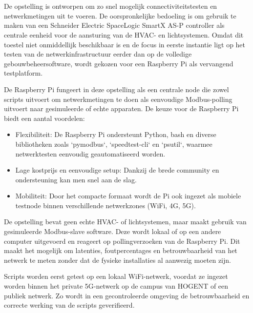 \chapter{}%
\label{ch:basisopstelling}

De opstelling is ontworpen om zo snel mogelijk connectiviteitstesten en netwerkmetingen uit te voeren. De oorspronkelijke bedoeling is om gebruik te maken van een Schneider Electric SpaceLogic SmartX AS-P controller als centrale eenheid voor de aansturing van de HVAC- en lichtsystemen. Omdat dit toestel niet onmiddellijk beschikbaar is en de focus in eerste instantie ligt op het testen van de netwerkinfrastructuur eerder dan op de volledige gebouwbeheersoftware, wordt gekozen voor een Raspberry Pi als vervangend testplatform.

De Raspberry Pi fungeert in deze opstelling als een centrale node die zowel scripts uitvoert om netwerkmetingen te doen als eenvoudige Modbus-polling uitvoert naar gesimuleerde of echte apparaten. De keuze voor de Raspberry Pi biedt een aantal voordelen:

\begin{itemize}
    \item Flexibiliteit: De Raspberry Pi ondersteunt Python, bash en diverse bibliotheken zoals `pymodbus`, `speedtest-cli` en `psutil`, waarmee netwerktesten eenvoudig geautomatiseerd worden.
    \item Lage kostprijs en eenvoudige setup: Dankzij de brede community en ondersteuning kan men snel aan de slag.
    \item Mobiliteit: Door het compacte formaat wordt de Pi ook ingezet als mobiele testnode binnen verschillende netwerkzones (WiFi, 4G, 5G).
\end{itemize}

De opstelling bevat geen echte HVAC- of lichtsystemen, maar maakt gebruik van gesimuleerde Modbus-slave software. Deze wordt lokaal of op een andere computer uitgevoerd en reageert op pollingverzoeken van de Raspberry Pi. Dit maakt het mogelijk om latenties, foutpercentages en betrouwbaarheid van het netwerk te meten zonder dat de fysieke installaties al aanwezig moeten zijn.

Scripts worden eerst getest op een lokaal WiFi-netwerk, voordat ze ingezet worden binnen het private 5G-netwerk op de campus van HOGENT of een publiek netwerk. Zo wordt in een gecontroleerde omgeving de betrouwbaarheid en correcte werking van de scripts geverifieerd.

